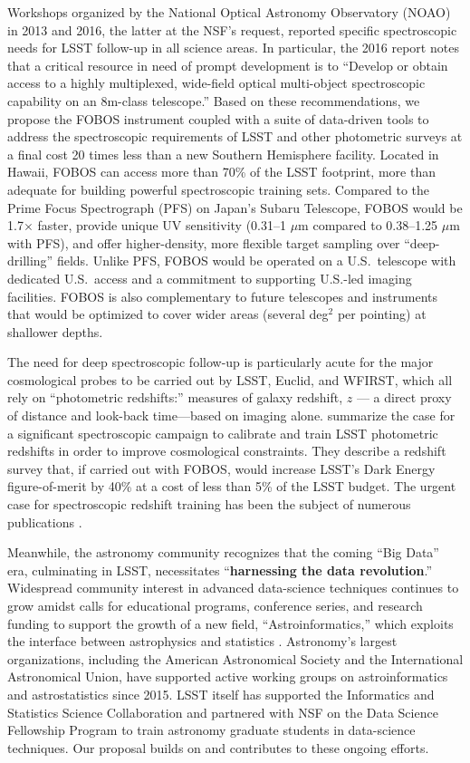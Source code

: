 Workshops organized by the National Optical Astronomy Observatory (NOAO)
in 2013 and 2016, the latter at the NSF's request, reported specific
spectroscopic needs for LSST follow-up in all science areas.  In
particular, the 2016 report notes that a critical resource in need of
prompt development is to ``Develop or obtain access to a highly
multiplexed, wide-field optical multi-object spectroscopic capability on
an 8m-class telescope.''  Based on these recommendations, we propose the
FOBOS instrument coupled with a suite of data-driven tools to address
the spectroscopic requirements of LSST and other photometric surveys at
a final cost 20 times less than a new Southern Hemisphere facility.
Located in Hawaii, FOBOS can access more than 70\% of the LSST
footprint, more than adequate for building powerful
spectroscopic training sets.  Compared to the Prime Focus Spectrograph
(PFS) on Japan's Subaru Telescope, FOBOS would be 1.7$\times$ faster,
provide unique UV sensitivity (0.31--1 $\mu$m compared to
0.38--1.25 $\mu$m with PFS), and offer higher-density, more flexible
target sampling over ``deep-drilling'' fields.  Unlike PFS, FOBOS would be operated
on a U.S.\ telescope with dedicated U.S.\ access and a commitment to
supporting U.S.-led imaging facilities.  FOBOS is also complementary to
future telescopes and instruments that would be optimized to cover wider areas
(several deg$^2$ per pointing) at shallower depths.


The need for deep spectroscopic follow-up is particularly acute for the major cosmological probes to be carried out by
LSST, Euclid, and WFIRST, which all rely on ``photometric redshifts:'' measures of galaxy redshift, $z$
--- a direct proxy of distance and look-back time---based on imaging alone. \citet{newman15} summarize the case for a
    significant spectroscopic campaign to calibrate and train LSST photometric redshifts in order to improve cosmological constraints.  They describe a redshift survey that,
    if carried out with FOBOS, would increase LSST's Dark Energy figure-of-merit by 40\% at a cost of less than 5\% of
    the LSST budget.  The urgent case for spectroscopic redshift training has been the subject of numerous publications
    \citep[e.g.,][]{laureijs11, masters15, hemmati18}.

Meanwhile, the astronomy community recognizes that the coming ``Big
Data'' era, culminating in LSST, necessitates ``\textbf{harnessing the
data revolution}.''  Widespread community interest in advanced
data-science techniques continues to grow amidst calls for educational
programs, conference series, and research funding to support the growth
of a new field, ``Astroinformatics,'' which exploits the interface
between astrophysics and statistics \citep{borne09}.  Astronomy's
largest organizations, including the American Astronomical Society and
the International Astronomical Union, have supported active working
groups on astroinformatics and astrostatistics since 2015.  LSST itself
has supported the Informatics and Statistics Science Collaboration and
partnered with NSF on the Data Science Fellowship Program to train
astronomy graduate students in data-science techniques.  Our proposal
builds on and contributes to these ongoing efforts.

